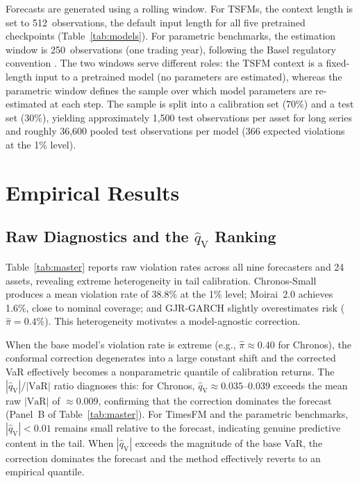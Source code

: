 \documentclass[preprint,11pt,authoryear]{elsarticle}
\newcommand{\VaR}{\mathrm{VaR}}
\newcommand{\1}{\boldsymbol{1}}
\newcommand{\qV}{\hat{q}_{\scriptscriptstyle\mathrm{V}}}
\begin{document}
	Forecasts are generated using a rolling window. For
	TSFMs, the context length is set to 512~observations,
	the default input length for all five pretrained
	checkpoints (Table~\ref{tab:models}). For parametric
	benchmarks, the estimation window is 250~observations
	(one trading year), following the Basel regulatory
	convention
	\citep{basel1996}.
	The two windows serve different roles: the TSFM
	context is a fixed-length input to a pretrained model
	(no parameters are estimated), whereas the parametric
	window defines the sample over which model parameters
	are re-estimated at each step. The sample is split into a calibration set (70\%) and
	a test set (30\%), yielding approximately 1,500 test
	observations per asset for long series and roughly 36,600
	pooled test observations per model (366 expected violations
	at the 1\% level).
	
	\section{Empirical Results}
	\label{sec:results}
	
	\subsection{Raw Diagnostics and the $\qV$ Ranking}
	\label{sec:results_raw}
	\label{sec:diagnostic}
	
	Table~\ref{tab:master} reports raw violation rates across all
	nine forecasters and 24 assets, revealing extreme heterogeneity
	in tail calibration. Chronos-Small produces a mean violation
	rate of 38.8\% at the 1\% level; Moirai~2.0 achieves 1.6\%,
	close to nominal coverage; and GJR-GARCH slightly overestimates
	risk ($\hat\pi = 0.4$\%). This heterogeneity motivates a
	model-agnostic correction.
	
	When the base model's violation rate is extreme (e.g.,
	$\hat\pi \approx 0.40$ for Chronos), the conformal correction
	degenerates into a large constant shift and the corrected VaR
	effectively becomes a nonparametric quantile of calibration
	returns. The $|\qV|/|\VaR|$ ratio diagnoses this: for
	Chronos, $\qV \approx 0.035$--$0.039$ exceeds the mean raw
	$|\VaR|$ of $\approx 0.009$, confirming that the correction
	dominates the forecast (Panel~B of
	Table~\ref{tab:master}). For TimesFM and the parametric
	benchmarks, $|\qV| < 0.01$ remains small relative to the
	forecast, indicating genuine predictive content in the tail.
	When $|\qV|$ exceeds the magnitude of the base VaR, the correction dominates the forecast and the method effectively reverts to an empirical quantile.
\end{document}
